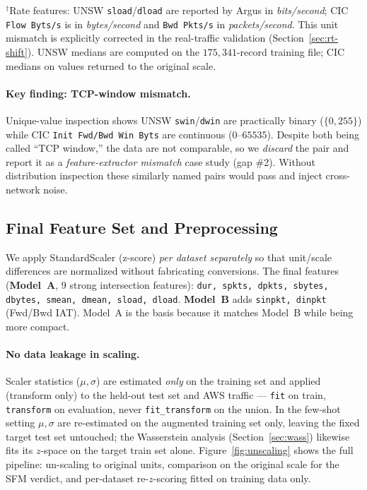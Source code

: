 \documentclass[preprint,12pt,authoryear]{elsarticle}
\begin{document}
\begin{table}[t]
\vspace{0.4em}
\raggedright{\footnotesize $^\dagger$Rate features: UNSW \texttt{sload}/\texttt{dload}
are reported by Argus in \emph{bits/second}; CIC \texttt{Flow Byts/s} is in
\emph{bytes/second} and \texttt{Bwd Pkts/s} in \emph{packets/second}. This unit
mismatch is explicitly corrected in the real-traffic validation
(Section~\ref{sec:rt-shift}). UNSW medians are computed on the $175{,}341$-record
training file; CIC medians on values returned to the original scale.}
\end{table}

\paragraph{Key finding: TCP-window mismatch.} Unique-value inspection shows UNSW
\texttt{swin}/\texttt{dwin} are practically binary ($\{0,255\}$) while CIC
\texttt{Init Fwd/Bwd Win Byts} are continuous ($0$--$65535$). Despite both being
called ``TCP window,'' the data are not comparable, so we \emph{discard} the pair and
report it as a \emph{feature-extractor mismatch} case study (gap \#2). Without
distribution inspection these similarly named pairs would pass and inject
cross-network noise.

\subsection{Final Feature Set and Preprocessing}
We apply StandardScaler (z-score) \emph{per dataset separately} so that
unit/scale differences are normalized without fabricating conversions. The final
features (\textbf{Model~A}, 9 strong intersection features): \texttt{dur, spkts,
dpkts, sbytes, dbytes, smean, dmean, sload, dload}. \textbf{Model~B} adds
\texttt{sinpkt, dinpkt} (Fwd/Bwd IAT). Model~A is the basis because it matches
Model~B while being more compact.

\paragraph{No data leakage in scaling.} Scaler statistics ($\mu,\sigma$) are
estimated \emph{only} on the training set and applied (transform only) to the
held-out test set and AWS traffic --- \texttt{fit} on train, \texttt{transform} on
evaluation, never \texttt{fit\_transform} on the union. In the few-shot setting
$\mu,\sigma$ are re-estimated on the augmented training set only, leaving the fixed
target test set untouched; the Wasserstein analysis (Section~\ref{sec:wass})
likewise fits its $z$-space on the target train set alone. Figure~\ref{fig:unscaling}
shows the full pipeline: un-scaling to original units, comparison on the original
scale for the SFM verdict, and per-dataset re-$z$-scoring fitted on training data
only.
\end{document}
